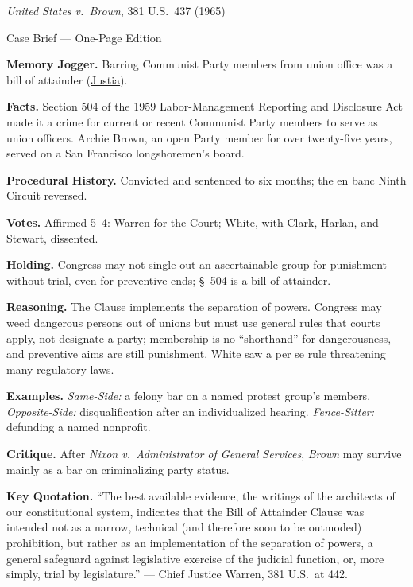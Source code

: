 \documentclass[12pt]{article}
\begin{document}
\begin{center}
{\Large \textit{United States v.\ Brown}, 381 U.S.\ 437 (1965)\par}
\vspace{0.3em}
{\normalsize Case Brief --- One-Page Edition\par}
\end{center}

\textbf{Memory Jogger.} Barring Communist Party members from union office was a bill of attainder (\href{https://supreme.justia.com/cases/federal/us/381/437/}{Justia}).

\textbf{Facts.} Section 504 of the 1959 Labor-Management Reporting and Disclosure Act made it a crime for current or recent Communist Party members to serve as union officers. Archie Brown, an open Party member for over twenty-five years, served on a San Francisco longshoremen's board.

\textbf{Procedural History.} Convicted and sentenced to six months; the en banc Ninth Circuit reversed.

\textbf{Votes.} Affirmed 5--4: Warren for the Court; White, with Clark, Harlan, and Stewart, dissented.

\textbf{Holding.} Congress may not single out an ascertainable group for punishment without trial, even for preventive ends; \S~504 is a bill of attainder.

\textbf{Reasoning.} The Clause implements the separation of powers. Congress may weed dangerous persons out of unions but must use general rules that courts apply, not designate a party; membership is no ``shorthand'' for dangerousness, and preventive aims are still punishment. White saw a per se rule threatening many regulatory laws.

\textbf{Examples.} \emph{Same-Side:} a felony bar on a named protest group's members. \emph{Opposite-Side:} disqualification after an individualized hearing. \emph{Fence-Sitter:} defunding a named nonprofit.

\textbf{Critique.} After \textit{Nixon v.\ Administrator of General Services}, \textit{Brown} may survive mainly as a bar on criminalizing party status.

\textbf{Key Quotation.} ``The best available evidence, the writings of the architects of our constitutional system, indicates that the Bill of Attainder Clause was intended not as a narrow, technical (and therefore soon to be outmoded) prohibition, but rather as an implementation of the separation of powers, a general safeguard against legislative exercise of the judicial function, or, more simply, trial by legislature.'' --- Chief Justice Warren, 381 U.S.\ at 442.
\end{document}
